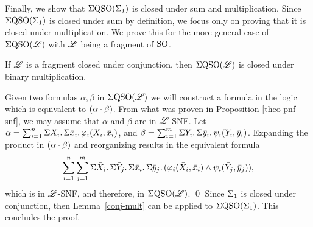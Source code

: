 Finally, we show that $\Sigma{\rm QSO}(\Sigma_{1})$ is closed under sum and multiplication. 
Since $\Sigma{\rm QSO}(\Sigma_{1})$ is closed under sum by definition, we focus only on proving that it is closed under multiplication. 
We prove this for the more general case of $\Sigma{\rm QSO}(\mathscr{L})$ with $\mathscr{L}$ being a fragment of ${\rm SO}$.

\begin{lem} \label{conj-mult}
	If $\mathscr{L}$ is a fragment closed under conjunction, then $\Sigma{\rm QSO}(\mathscr{L})$ is closed under binary multiplication.
\end{lem}
\proof
	Given two formulas $\alpha, \beta$ in $\Sigma{\rm QSO}(\mathscr{L})$ we will construct a formula in the logic which is equivalent to $(\alpha\cdot \beta)$. 
	From what was proven in Proposition \ref{theo-pnf-snf}, we may assume that $\alpha$ and $\beta$ are in $\mathscr{L}$-SNF. 
	Let $\alpha = \sum_{i = 1}^n\Sigma{\bar{X}_i}.\,\Sigma{\bar{x}_i}.\,\varphi_i(\bar{X}_i,\bar{x}_i)$, and $\beta = \sum_{i = 1}^m\Sigma{\bar{Y}_i}.\,\Sigma{\bar{y}_i}.\,\psi_i(\bar{Y}_i,\bar{y}_i)$. Expanding the product in $(\alpha\cdot \beta)$ and reorganizing results in the equivalent formula
	$$
	\sum_{i = 1}^n\sum_{j = 1}^m\Sigma{\bar{X}_i}.\,\Sigma{\bar{Y}_j}.\,\Sigma{\bar{x}_i}.\,\Sigma{\bar{y}_j}.\,(\varphi_i(\bar{X}_i,\bar{x}_i)\wedge\psi_i(\bar{Y}_j,\bar{y}_j)),
	$$
	which is in $\mathscr{L}$-SNF, and therefore, in $\Sigma{\rm QSO}(\mathscr{L})$.
\qed
Since $\Sigma_{1}$ is closed under conjunction, then Lemma~\ref{conj-mult} can be applied to $\Sigma{\rm QSO}(\Sigma_{1})$. 
This concludes the proof.

